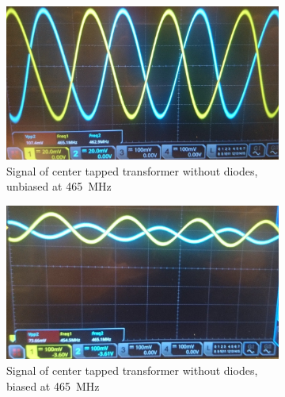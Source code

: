 \begin{figure}[ht]
	\centering
	\begin{subfigure}{0.4\textwidth}
		\centering
		\includegraphics[width=\textwidth]{Chapters/Deflection/unbiased3}
		\caption{Signal of center tapped transformer without diodes, unbiased at \SI{465}{\mega\hertz}}
		\label{fig:unbiased2}
	\end{subfigure}
	\hspace{0.1\textwidth}
	\begin{subfigure}{0.4\textwidth}
		\centering
		\includegraphics[width=\textwidth]{Chapters/Deflection/biased3}
		\caption{Signal of center tapped transformer without diodes, biased at \SI{465}{\mega\hertz}}
		\label{fig:biased2}
	\end{subfigure}
	\caption{}
	\label{fig:CTTSignal}
\end{figure}



